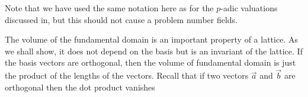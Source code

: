 


\epsfverbosetrue



Note that we have used the same notation here as for the $p$-adic
valuations discussed in, but this should not cause a problem number
fields.

\begin{figure}
\begin {center}
\end{center}
\end{figure}

The volume of the fundamental domain is an important property of a
lattice.  As we shall show, it does not depend on the basis but is an
invariant of the lattice.  If the basis vectors are orthogonal, then
the volume of fundamental domain is just the product of the lengths of
the vectors.  Recall that if two vectors $\vec{a}$ and $\vec{b}$ are
orthogonal then the dot product vanishes



